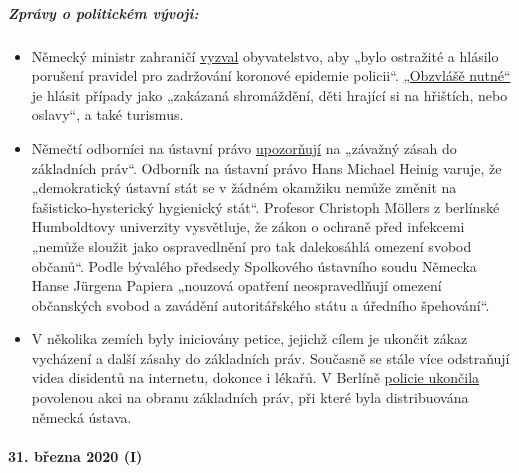 \hypertarget{zpruxe1vy-o-politickuxe9m-vuxfdvoji}{%
\subparagraph{\texorpdfstring{\textbf{Zprávy o politickém
vývoji:}}{Zprávy o politickém vývoji:}}\label{zpruxe1vy-o-politickuxe9m-vuxfdvoji}}

\begin{itemize}
\tightlist
\item
  Německý ministr zahraničí
  \href{https://de.nachrichten.yahoo.com/strobl-b\%C3\%BCrger-verst\%C3\%B6\%C3\%9Fe-gegen-corona-regeln-polizei-melden-095746341.html}{vyzval}
  obyvatelstvo, aby „bylo ostražité a hlásilo porušení pravidel pro
  zadržování koronové epidemie policii``.
  \href{https://www.br.de/nachrichten/bayern/buerger-melden-eifrig-verstoesse-gegen-corona-regeln,RuGXp1h}{„Obzvlášě
  nutné``} je hlásit případy jako „zakázaná shromáždění, děti hrající si
  na hřištích, nebo oslavy``, a také turismus.
\item
  Němečtí odborníci na ústavní právo
  \href{https://www.focus.de/politik/deutschland/corona-regelungen-der-regierung-medizin-darf-nicht-gefaehrlicher-sein-als-die-krankheit_id_11827625.html}{upozorňují}
  na „závažný zásah do základních práv``. Odborník na ústavní právo Hans
  Michael Heinig varuje, že „demokratický ústavní stát se v žádném
  okamžiku nemůže změnit na fašisticko-hysterický hygienický stát``.
  Profesor Christoph Möllers z berlínské Humboldtovy univerzity
  vysvětluje, že zákon o ochraně před infekcemi „nemůže sloužit jako
  ospravedlnění pro tak dalekosáhlá omezení svobod občanů``. Podle
  bývalého předsedy Spolkového ústavního soudu Německa Hanse Jürgena
  Papiera „nouzová opatření neospravedlňují omezení občanských svobod a
  zavádění autoritářského státu a úředního špehování``.
\item
  V několika zemích byly iniciovány petice, jejichž cílem je ukončit
  zákaz vycházení a další zásahy do základních práv. Současně se stále
  více odstraňují videa disidentů na internetu, dokonce i lékařů. V
  Berlíně
  \href{https://www.heise.de/tp/features/Wenn-Demonstranten-zu-Gefaehrdern-erklaert-werden-4692869.html}{policie
  ukončila} povolenou akci na obranu základních práv, při které byla
  distribuována německá ústava.
\end{itemize}

\hypertarget{31-bux159ezna-2020-i}{%
\paragraph{31. března 2020 (I)}\label{31-bux159ezna-2020-i}}

